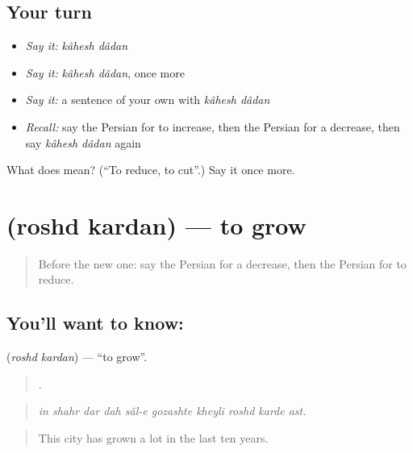 \subsection*{Your turn}
\begin{itemize}
\raggedright
  \item \emph{Say it:} \emph{kâhesh dâdan}
  \item \emph{Say it:} \emph{kâhesh dâdan}, once more
  \item \emph{Say it:} a sentence of your own with \emph{kâhesh dâdan}
  \item \emph{Recall:} say the Persian for to increase, then the Persian for a decrease, then say \emph{kâhesh dâdan} again
\end{itemize}

\begin{tcolorbox}[breakable,colback=teal!4,colframe=teal!35!black,title={Before you move on}]
What does   mean? (\textquotedblleft{}To reduce, to cut\textquotedblright{}.) Say it once more.
\end{tcolorbox}
\section[\texorpdfstring{\fa{رشد} \fa{کردن} (roshd kardan)}{رشد کردن (roshd kardan)}]{  (roshd kardan) — to grow}

\label{lesson:FA-C373-roshd-kardan}



\begin{quote}
Before the new one: say the Persian for a decrease, then the Persian for to reduce.
\end{quote}

\subsection*{You'll want to know:  }
\textbf{ } (\emph{roshd kardan}) — \textquotedblleft{}to grow\textquotedblright{}.

\begin{quote}
         .
\end{quote}

\begin{quote}
\emph{in shahr dar dah sâl-e gozashte kheyli roshd karde ast.}
\end{quote}

\begin{quote}
This city has grown a lot in the last ten years.
\end{quote}

